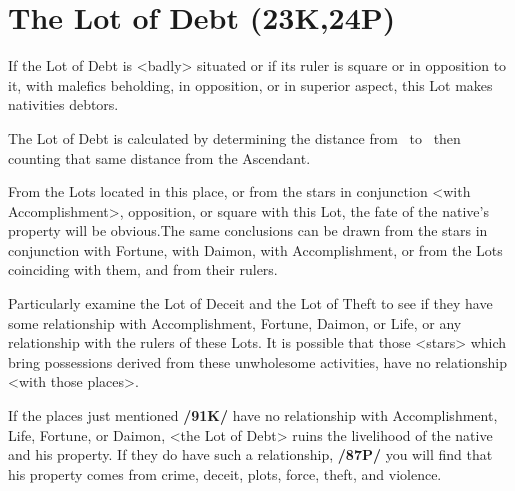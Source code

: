 \section{The Lot of Debt (23K,24P)}
If the Lot of Debt is <badly> situated or if its ruler is square or in opposition to it, with malefics beholding, in opposition, or in superior aspect, this Lot makes nativities debtors. 

The Lot of Debt is calculated  by determining the distance from \Mercury\, to \Saturn\, then counting that same distance from the Ascendant. 

From the Lots located in this place, or from the stars in conjunction <with Accomplishment>, opposition, or square with this Lot, the fate of the native’s property will be obvious.\mndl The same conclusions can be drawn from the stars in conjunction with Fortune, with Daimon, with Accomplishment,
or from the Lots coinciding with them, and from their rulers.

Particularly examine the Lot of Deceit and the Lot of Theft to see if they have some relationship with Accomplishment, Fortune, Daimon, or Life, or any relationship with the rulers of these Lots. It is possible that those <stars> which bring possessions derived from these unwholesome activities, have no relationship <with those places>. 

If \mndl the places just mentioned \textbf{/91K/} have no relationship with Accomplishment, Life, Fortune, or Daimon, <the Lot of Debt> ruins the livelihood of the native and his property. If they do have such a relationship, \textbf{/87P/} you will find that his property comes from crime, deceit, plots, force, theft, and violence.

\newpage